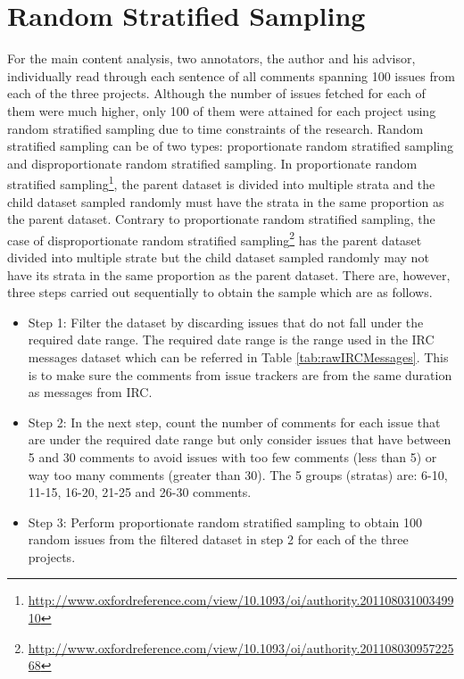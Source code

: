 \documentclass[a4paper,12pt,twoside]{report}
\begin{document}
\section{Random Stratified Sampling}
For the main content analysis, two annotators, the author and his advisor, individually read through each sentence of all comments spanning 100 issues from each of the three projects. Although the number of issues fetched for each of them were much higher, only 100 of them were attained for each project using random stratified sampling due to time constraints of the research. 
\newline \newline 
Random stratified sampling can be of two types: proportionate random stratified sampling and disproportionate random stratified sampling. In proportionate random stratified sampling\footnote{\url{http://www.oxfordreference.com/view/10.1093/oi/authority.20110803100349910}}, the parent dataset is divided into multiple strata and the child dataset sampled randomly must have the strata in the same proportion as the parent dataset. Contrary to proportionate random stratified sampling, the case of disproportionate random stratified sampling\footnote{\url{http://www.oxfordreference.com/view/10.1093/oi/authority.20110803095722568}} has the parent dataset divided into multiple strate but the child dataset sampled randomly may not have its strata in the same proportion as the parent dataset. There are, however, three steps carried out sequentially to obtain the sample which are as follows.
\begin{itemize}
\item {Step 1:} Filter the dataset by discarding issues that do not fall under the required date range. The required date range is the range used in the \acs{IRC} messages dataset which can be referred in Table \ref{tab:rawIRCMessages}. This is to make sure the comments from issue trackers are from the same duration as messages from \acs{IRC}. 
\item {Step 2:} In the next step, count the number of comments for each issue that are under the required date range but only consider issues that have between 5 and 30 comments to avoid issues with too few comments (less than 5) or way too many comments (greater than 30). The 5 groups (stratas) are: 6-10, 11-15, 16-20, 21-25 and 26-30 comments.
\item {Step 3:} Perform proportionate random stratified sampling to obtain 100 random issues from the filtered dataset in step 2 for each of the three projects. 
\end{itemize}
\end{document}
